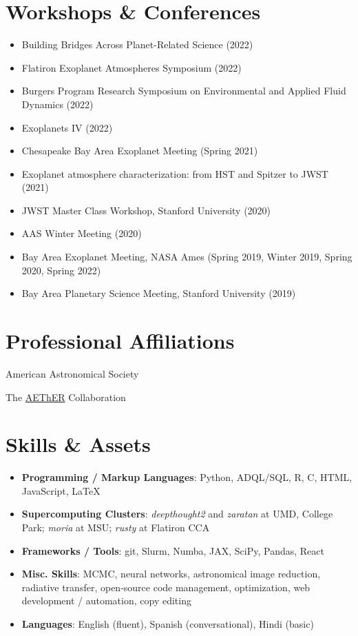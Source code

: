 \documentclass[letterpaper,10.5pt]{article}
\newcommand{\resumeItem}[2]{
  \item\small{
    \textbf{#1}{#2 \vspace{-2pt}}
  }
}
\newcommand{\resumeSubHeadingListStart}{\begin{itemize}[leftmargin=*]}
\newcommand{\resumeSubHeadingListEnd}{\end{itemize}}
\newcommand{\resumeItemListStart}{\begin{itemize}}
\newcommand{\resumeItemListEnd}{\end{itemize}\vspace{-5pt}}
\newcommand{\shorterSection}[1]{\vspace{-10pt}\section{#1}}
\begin{document}
\shorterSection{Workshops \& Conferences}
\resumeItemListStart
\resumeItem{}{Building Bridges Across Planet-Related Science (2022)}
\resumeItem{}{Flatiron Exoplanet Atmospheres Symposium (2022)}
\resumeItem{}{Burgers Program Research
Symposium on Environmental and Applied Fluid Dynamics (2022)}
\resumeItem{}{Exoplanets IV (2022)}
\resumeItem{}{Chesapeake Bay Area Exoplanet Meeting (Spring 2021)}
\resumeItem{}{Exoplanet atmosphere characterization: from HST and Spitzer to JWST (2021)}
\resumeItem{}{JWST Master Class Workshop, Stanford University (2020)}
\resumeItem{}{AAS Winter Meeting (2020)}
\resumeItem{}{Bay Area Exoplanet Meeting, NASA Ames (Spring 2019, Winter 2019, Spring 2020, Spring 2022)}
\resumeItem{}{Bay Area Planetary Science Meeting, Stanford University (2019)}
\resumeItemListEnd

\shorterSection{Professional Affiliations}
\small
  \begin{list}{}{\cvlist}
  \item[{\color{numcolor}}]American Astronomical Society
  \item[{\color{numcolor}}]The \href{https://planets.carnegiescience.edu/}{AEThER} Collaboration



  \end{list}


\shorterSection{Skills \& Assets}
  \resumeSubHeadingListStart
  \small
    \item{
     \textbf{Programming / Markup Languages}{: Python, ADQL/SQL, R, C, HTML, JavaScript, \LaTeX}
    }
    \vspace{-5pt}
    \item{
     \textbf{Supercomputing Clusters}{: \textit{deepthought2} and \textit{zaratan} at UMD, College Park; \textit{moria} at MSU; \textit{rusty} at Flatiron CCA}
    }
    \vspace{-5pt}
    \item{
     \textbf{Frameworks / Tools}{: git, Slurm, Numba, JAX, SciPy, Pandas, React}
    }
    \vspace{-5pt}
    \item{
     \textbf{Misc. Skills}{: MCMC, neural networks, astronomical image reduction, radiative transfer, open-source code management, optimization, web development / automation, copy editing}
    }
    \vspace{-5pt}
    \item{
     \textbf{Languages}{: English (fluent), Spanish (conversational), Hindi (basic)}
    }
\resumeSubHeadingListEnd
\end{document}

